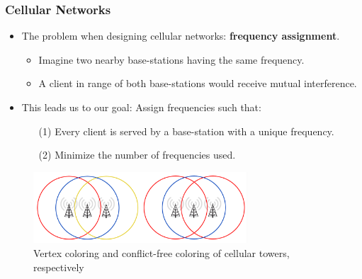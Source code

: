 \documentclass[xcolor=dvipsnames,aspectratio=1610]{beamer}
\begin{document}
  \begin{frame}
    \frametitle{Cellular Networks}

    \begin{itemize}
      \item The problem when designing cellular networks: \textbf{frequency assignment}.
      \begin{itemize}
        \item Imagine two nearby base-stations having the same frequency.
        \item A client in range of both base-stations would receive mutual interference.
      \end{itemize}
    \end{itemize}

    \pause
    \vspace{-0.2cm}

    \begin{itemize}
      \item This leads us to our goal: Assign frequencies such that:
      \pause
      \begin{itemize}
        \item[(1)] Every client is served by a base-station with a unique frequency.
        \pause
        \item[(2)] Minimize the number of frequencies used.
      \end{itemize}
    \end{itemize}

    \pause
    \vfill

    \begin{figure}[h]
      \centering
      \includegraphics[width=8cm,trim=4 4 4 4,clip]{../figures/towers.pdf}
      \caption*{Vertex coloring and conflict-free coloring of cellular towers, respectively}
    \end{figure}

  \end{frame}

\end{document}
